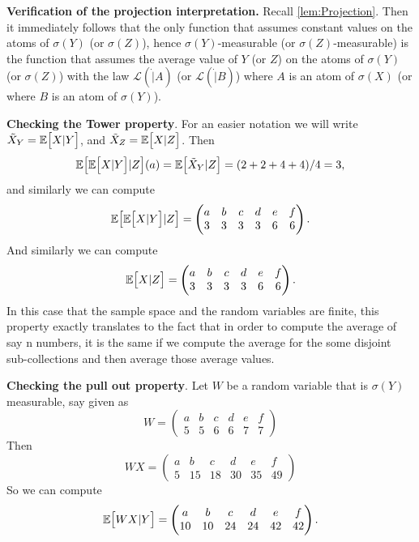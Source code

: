 \begin{solution}
	\noindent \textbf{Verification of the projection interpretation.} Recall \autoref{lem:Projection}. Then it immediately follows that the only function that assumes constant values on the atoms of $ \sigma(Y) $ (or $ \sigma(Z) $), hence $ \sigma(Y) $-measurable (or $ \sigma(Z) $-measurable) is the function that assumes the average value of $ Y $ (or $ Z $) on the atoms of $ \sigma(Y) $ (or $ \sigma(Z) $) with the law $ \mathcal{L}(\dot|A) $ (or $ \mathcal{L}(\dot|B) $) where $ A $ is an atom of $ \sigma(X) $ (or where $ B $ is an atom of $ \sigma(Y) $).
	
	\noindent \textbf{Checking the Tower property}. For an easier notation we will write $ \tilde{X}_Y = \mathbb{E}\big[X|Y\big] $, and $ \tilde{X}_Z = \mathbb{E}\big[X|Z\big] $. Then 
	\[ \mathbb{E}\big[\mathbb{E}\big[X|Y\big]|Z\big](a) = \mathbb{E}\big[\tilde{X}_Y|Z\big] = (2+2+4+4)/4 = 3, \]
	and similarly we can compute
	\[ \mathbb{E}\big[\mathbb{E}\big[X|Y\big]|Z\big] = \begin{pmatrix}
		a & b & c & d & e & f \\
		3 & 3 & 3 & 3 & 6 & 6
	\end{pmatrix}. \]
	And similarly we can compute
	\[ \mathbb{E}\big[X|Z\big] = \begin{pmatrix}
		a & b & c & d & e & f \\
		3 & 3 & 3 & 3 & 6 & 6
	\end{pmatrix}. \]
	In this case that the sample space and the random variables are finite, this property exactly translates to the fact that in order to compute the average of say n numbers, it is the same if we compute the average for the some disjoint sub-collections and then average those average values.
	
	\noindent \textbf{Checking the pull out property}. Let $ W $ be a random variable that is $ \sigma(Y) $ measurable, say given as
	\[ W = \begin{pmatrix}
		a & b & c & d & e & f\\
		5 & 5 & 6 & 6 & 7 & 7
	\end{pmatrix} \]
	Then 
	\[ WX = \begin{pmatrix}
		a & b & c & d & e & f\\
		5 & 15 & 18 & 30 & 35 & 49
	\end{pmatrix} \]
	So we can compute
	\[ \mathbb{E}\big[WX|Y\big] = \begin{pmatrix}
		a & b & c & d & e & f \\
		10 & 10 & 24 & 24 & 42 & 42
	\end{pmatrix}.  \]
\end{solution}




